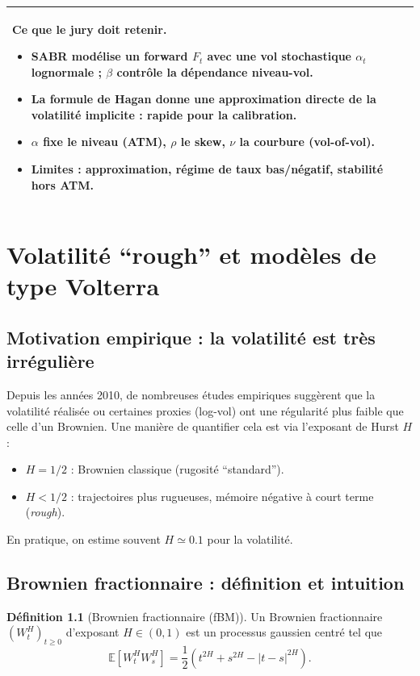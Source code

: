 \documentclass[11pt,a4paper]{report}
\newcommand{\E}{\mathbb{E}}
\newcommand{\1}{\mathbbm{1}}
\theoremstyle{definition}
\newtheorem{definition}{Définition}[chapter]
\theoremstyle{plain}
\theoremstyle{remark}
\newenvironment{jurybox}{%
  \begin{center}
  \setlength{\tabcolsep}{6pt}%
  \renewcommand{\arraystretch}{1.1}%
  \begin{tabular}{|p{0.94\textwidth}|}
  \hline
  \small\textbf{Ce que le jury doit retenir.}\par\medskip
}{%
  \\ \hline
  \end{tabular}
  \end{center}
}
\begin{document}
\begin{jurybox}
\begin{itemize}
\item SABR modélise un forward $F_t$ avec une vol stochastique $\alpha_t$ lognormale ; $\beta$ contrôle la dépendance niveau-vol.
\item La formule de Hagan donne une approximation directe de la volatilité implicite : rapide pour la calibration.
\item $\alpha$ fixe le niveau (ATM), $\rho$ le skew, $\nu$ la courbure (vol-of-vol).
\item Limites : approximation, régime de taux bas/négatif, stabilité hors ATM.
\end{itemize}
\end{jurybox}

\chapter{Volatilité ``rough'' et modèles de type Volterra}
\label{chap:rough}

\section{Motivation empirique : la volatilité est très irrégulière}
Depuis les années 2010, de nombreuses études empiriques suggèrent que la volatilité réalisée
ou certaines proxies (log-vol) ont une régularité plus faible que celle d'un Brownien.
Une manière de quantifier cela est via l'exposant de Hurst $H$ :
\begin{itemize}
  \item $H=1/2$ : Brownien classique (rugosité ``standard'').
  \item $H<1/2$ : trajectoires plus rugueuses, mémoire négative à court terme (\emph{rough}).
\end{itemize}
En pratique, on estime souvent $H\simeq 0.1$ pour la volatilité.

\section{Brownien fractionnaire : définition et intuition}
\begin{definition}[Brownien fractionnaire (fBM)]
Un Brownien fractionnaire $(W_t^H)_{t\ge 0}$ d'exposant $H\in(0,1)$ est un processus gaussien centré
tel que
\[
\E[W_t^H W_s^H] = \frac12\left(t^{2H}+s^{2H}-|t-s|^{2H}\right).
\]
\end{definition}
\end{document}
